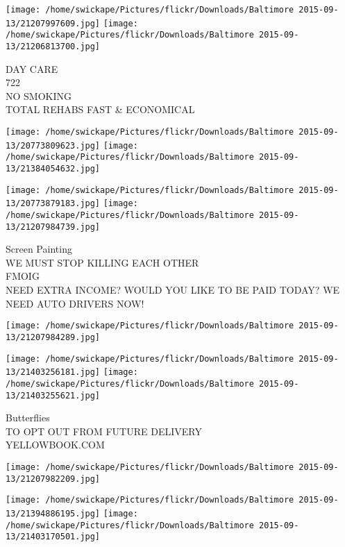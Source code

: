 \documentclass[10pt,letterpaper]{article}
\begin{document}
\texttt{[image: /home/swickape/Pictures/flickr/Downloads/Baltimore 2015-09-13/21207997609.jpg]}
\texttt{[image: /home/swickape/Pictures/flickr/Downloads/Baltimore 2015-09-13/21206813700.jpg]}

DAY CARE\\
722\\
NO SMOKING\\
TOTAL REHABS FAST \& ECONOMICAL\\
\pagebreak

\texttt{[image: /home/swickape/Pictures/flickr/Downloads/Baltimore 2015-09-13/20773809623.jpg]}
\texttt{[image: /home/swickape/Pictures/flickr/Downloads/Baltimore 2015-09-13/21384054632.jpg]}

\texttt{[image: /home/swickape/Pictures/flickr/Downloads/Baltimore 2015-09-13/20773879183.jpg]}
\texttt{[image: /home/swickape/Pictures/flickr/Downloads/Baltimore 2015-09-13/21207984739.jpg]}

Screen Painting\\
WE MUST STOP KILLING EACH OTHER\\
FMOIG\\
NEED EXTRA INCOME?  WOULD YOU LIKE TO BE PAID TODAY?  WE NEED AUTO DRIVERS NOW!\\
\pagebreak

\texttt{[image: /home/swickape/Pictures/flickr/Downloads/Baltimore 2015-09-13/21207984289.jpg]}

\vspace{0.25in}
\texttt{[image: /home/swickape/Pictures/flickr/Downloads/Baltimore 2015-09-13/21403256181.jpg]}
\texttt{[image: /home/swickape/Pictures/flickr/Downloads/Baltimore 2015-09-13/21403255621.jpg]}

Butterflies\\
TO OPT OUT FROM FUTURE DELIVERY\\
YELLOWBOOK.COM\\
\pagebreak

\texttt{[image: /home/swickape/Pictures/flickr/Downloads/Baltimore 2015-09-13/21207982209.jpg]}

\vspace{0.25in}
\texttt{[image: /home/swickape/Pictures/flickr/Downloads/Baltimore 2015-09-13/21394886195.jpg]}
\texttt{[image: /home/swickape/Pictures/flickr/Downloads/Baltimore 2015-09-13/21403170501.jpg]}
\end{document}
